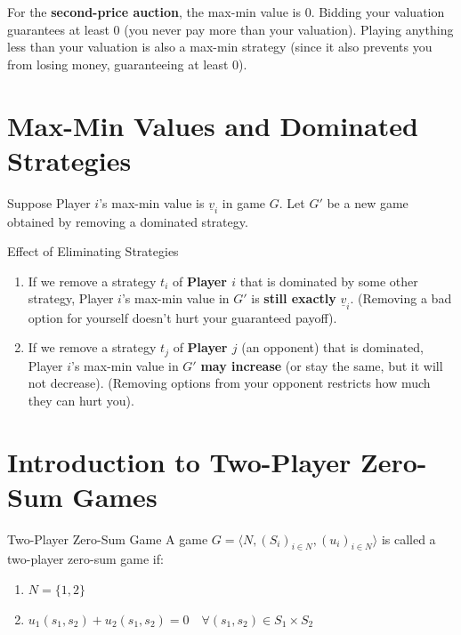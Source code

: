 \documentclass[12pt, a4paper]{article}
\begin{document}
\begin{notebox}
  For the \textbf{second-price auction}, the max-min value is $0$. Bidding your valuation guarantees at least 0 (you never pay more than your valuation). Playing anything less than your valuation is also a max-min strategy (since it also prevents you from losing money, guaranteeing at least 0).
\end{notebox}

\section{Max-Min Values and Dominated Strategies}

Suppose Player $i$'s max-min value is $\underline{v}_i$ in game $G$. Let $G'$ be a new game obtained by removing a dominated strategy.

\begin{thmbox}{Effect of Eliminating Strategies}
  \begin{enumerate}
      \item If we remove a strategy $t_i$ of \textbf{Player $i$} that is dominated by some other strategy, Player $i$'s max-min value in $G'$ is \textbf{still exactly} $\underline{v}_i$. (Removing a bad option for yourself doesn't hurt your guaranteed payoff).
      \item If we remove a strategy $t_j$ of \textbf{Player $j$} (an opponent) that is dominated, Player $i$'s max-min value in $G'$ \textbf{may increase} (or stay the same, but it will not decrease). (Removing options from your opponent restricts how much they can hurt you).
  \end{enumerate}
\end{thmbox}

\section{Introduction to Two-Player Zero-Sum Games}

\begin{defbox}{Two-Player Zero-Sum Game}
  A game $G = \langle N, (S_i)_{i \in N}, (u_i)_{i \in N} \rangle$ is called a two-player zero-sum game if:
  \begin{enumerate}
      \item $N = \{1, 2\}$
      \item $u_1(s_1, s_2) + u_2(s_1, s_2) = 0 \quad \forall (s_1, s_2) \in S_1 \times S_2$
  \end{enumerate}
\end{defbox}
\end{document}
